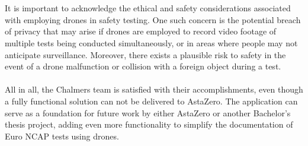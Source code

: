 \\ \\
It is important to acknowledge the ethical and safety considerations associated with employing drones in safety testing. One such concern is the potential breach of privacy that may arise if drones are employed to record video footage of multiple tests being conducted simultaneously, or in areas where people may not anticipate surveillance. Moreover, there exists a plausible risk to safety in the event of a drone malfunction or collision with a foreign object during a test.
\\ \\
All in all, the Chalmers team is satisfied with their accomplishments, even though a fully functional solution can not be delivered to AstaZero. The application can serve as a foundation for future work by either AstaZero or another Bachelor's thesis project, adding even more functionality to simplify the documentation of Euro NCAP tests using drones. 
